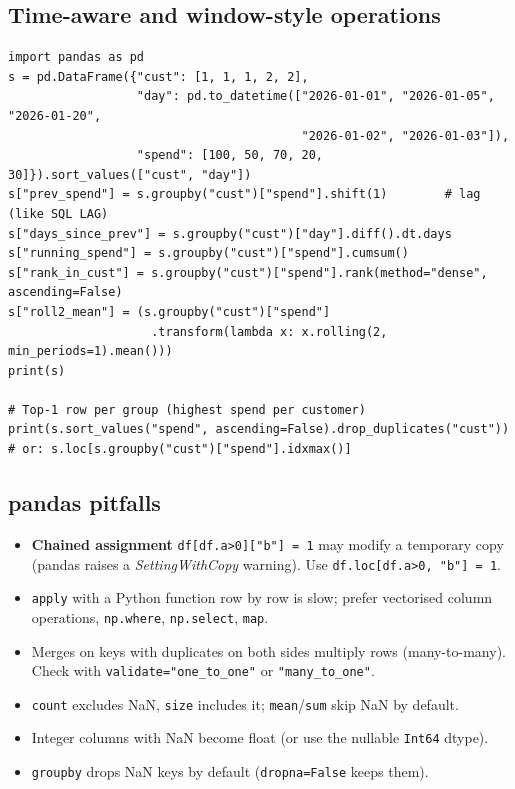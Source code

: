 \subsection{Time-aware and window-style operations}
\begin{lstlisting}[style=python]
import pandas as pd
s = pd.DataFrame({"cust": [1, 1, 1, 2, 2],
                  "day": pd.to_datetime(["2026-01-01", "2026-01-05", "2026-01-20",
                                         "2026-01-02", "2026-01-03"]),
                  "spend": [100, 50, 70, 20, 30]}).sort_values(["cust", "day"])
s["prev_spend"] = s.groupby("cust")["spend"].shift(1)        # lag (like SQL LAG)
s["days_since_prev"] = s.groupby("cust")["day"].diff().dt.days
s["running_spend"] = s.groupby("cust")["spend"].cumsum()
s["rank_in_cust"] = s.groupby("cust")["spend"].rank(method="dense", ascending=False)
s["roll2_mean"] = (s.groupby("cust")["spend"]
                    .transform(lambda x: x.rolling(2, min_periods=1).mean()))
print(s)

# Top-1 row per group (highest spend per customer)
print(s.sort_values("spend", ascending=False).drop_duplicates("cust"))
# or: s.loc[s.groupby("cust")["spend"].idxmax()]
\end{lstlisting}

\subsection{pandas pitfalls}
\begin{itemize}
  \item \textbf{Chained assignment} \texttt{df[df.a>0]["b"] = 1} may modify a temporary copy (pandas raises a \emph{SettingWithCopy} warning). Use \texttt{df.loc[df.a>0, "b"] = 1}.
  \item \texttt{apply} with a Python function row by row is slow; prefer vectorised column operations, \texttt{np.where}, \texttt{np.select}, \texttt{map}.
  \item Merges on keys with duplicates on both sides multiply rows (many-to-many). Check with \texttt{validate="one\_to\_one"} or \texttt{"many\_to\_one"}.
  \item \texttt{count} excludes NaN, \texttt{size} includes it; \texttt{mean}/\texttt{sum} skip NaN by default.
  \item Integer columns with NaN become float (or use the nullable \texttt{Int64} dtype).
  \item \texttt{groupby} drops NaN keys by default (\texttt{dropna=False} keeps them).
\end{itemize}

